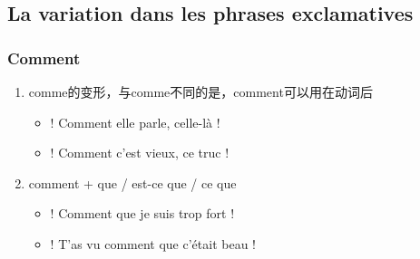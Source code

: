 \documentclass[UTF8]{report}
\begin{document}
\subsection{La variation dans les phrases exclamatives}

\subsubsection{Comment}
\begin{enumerate}
    \item comme的变形，与comme不同的是，comment可以用在动词后
    \begin{itemize}
        \item ! Comment elle parle, celle-là !
        \item ! Comment c’est vieux, ce truc !
    \end{itemize}
    \item comment + que / est-ce que / ce que
    \begin{itemize}
        \item ! Comment que je suis trop fort !
        \item ! T’as vu comment que c’était beau !
    \end{itemize}
\end{enumerate}
\end{document}
